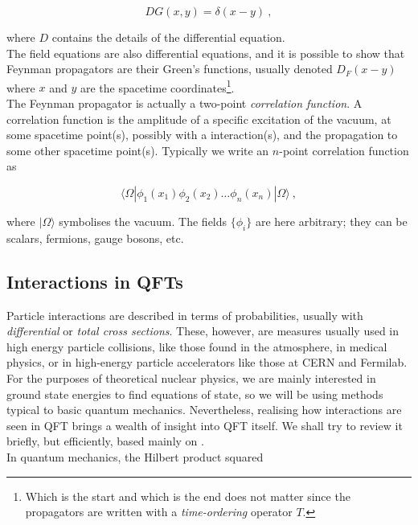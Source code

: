 \documentclass[10pt,twoside]{report}
\begin{document}
	\begin{equation}
		D G(x,y) = \delta(x-y)\:,
	\end{equation}
	
	\noindent where $D$ contains the details of the differential equation.\\
	
	The field equations are also differential equations, and it is possible to show that Feynman propagators are their Green's functions, usually denoted $D_F(x-y)$ where $x$ and $y$ are the spacetime coordinates\footnote{Which is the start and which is the end does not matter since the propagators are written with a \emph{time-ordering} operator $T$.}.\\
	
	The Feynman propagator is actually a two-point \emph{correlation function}. A correlation function is the amplitude of a specific excitation of the vacuum, at some spacetime point(s), possibly with a interaction(s), and the propagation to some other spacetime point(s). Typically we write an $n$-point correlation function as
	
	\begin{equation}
		\langle \Omega|\phi_1(x_1)\phi_2(x_2)\ldots\phi_n(x_n)|\Omega\rangle \:,
	\end{equation}

	\noindent where $|\Omega\rangle$ symbolises the vacuum. The fields $\{\phi_i\}$ are here arbitrary; they can be scalars, fermions, gauge bosons, etc.
		
	\subsection{Interactions in QFTs}
	Particle interactions are described in terms of probabilities, usually with \emph{differential} or \emph{total cross sections}. These, however, are measures usually used in high energy particle collisions, like those found in the atmosphere, in medical physics, or in high-energy particle accelerators like those at CERN and Fermilab. For the purposes of theoretical nuclear physics, we are mainly interested in ground state energies to find equations of state, so we will be using methods typical to basic quantum mechanics. Nevertheless, realising how interactions are seen in QFT brings a wealth of insight into QFT itself. We shall try to review it briefly, but efficiently, based mainly on \cite{PeskinSchroeder}.\\
	
	In quantum mechanics, the Hilbert product squared
	
\end{document}
